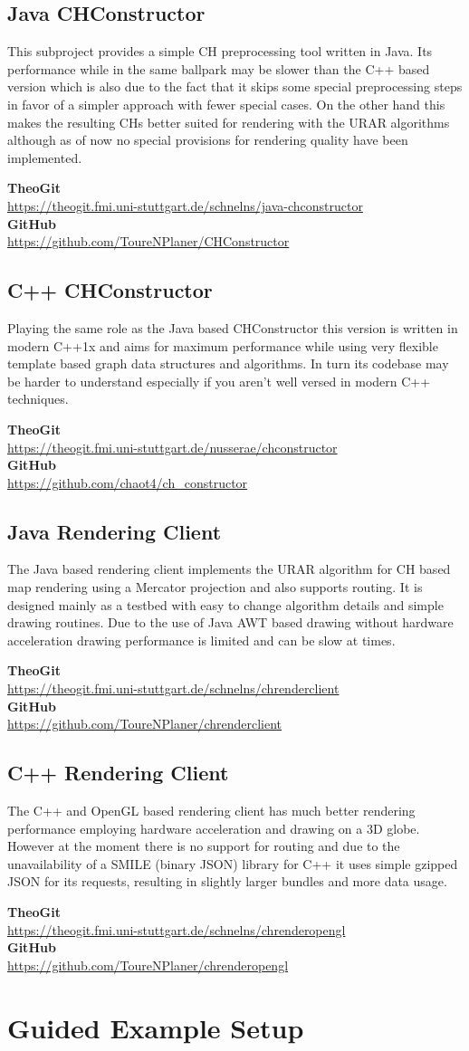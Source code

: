 \documentclass[titlepage,parskip=true]{scrartcl}
\newcommand{\repobox}[2]{
	\begin{shaded}
		\textbf{TheoGit}\\\hspace{5mm}\url{#1}\\
		\textbf{GitHub}\\\hspace{5mm}\url{#2}
	\end{shaded}
}
\begin{document}
\subsection{Java CHConstructor}
This subproject provides a simple CH preprocessing tool written in Java. Its
performance while in the same ballpark may be slower than the C++ based version
which is also due to the fact that it skips some special preprocessing steps in
favor of a simpler approach with fewer special cases. On the other hand this
makes the resulting CHs better suited for rendering with the URAR algorithms
although as of now no special provisions for rendering quality have been
implemented.
\repobox{https://theogit.fmi.uni-stuttgart.de/schnelns/java-chconstructor}{https://github.com/ToureNPlaner/CHConstructor}
\subsection{C++ CHConstructor}
Playing the same role as the Java based CHConstructor this version is written
in modern C++1x and aims for maximum performance while using very flexible
template based graph data structures and algorithms. In turn its codebase may
be harder to understand especially if you aren't well versed in modern C++
techniques.
\repobox{https://theogit.fmi.uni-stuttgart.de/nusserae/chconstructor}{https://github.com/chaot4/ch\_constructor}
\subsection{Java Rendering Client}
The Java based rendering client implements the URAR algorithm for CH based map
rendering using a Mercator projection and also supports routing. It is designed
mainly as a testbed with easy to change algorithm details and simple drawing
routines. Due to the use of Java AWT based drawing without hardware
acceleration drawing performance is limited and can be slow at times.
\repobox{https://theogit.fmi.uni-stuttgart.de/schnelns/chrenderclient}{https://github.com/ToureNPlaner/chrenderclient}
\subsection{C++ Rendering Client}
The C++ and OpenGL based rendering client has much better rendering performance
employing hardware acceleration and drawing on a 3D globe. However at the
moment there is no support for routing and due to the unavailability of a SMILE
(binary JSON) library for C++ it uses simple gzipped JSON for its requests,
resulting in slightly larger bundles and more data usage.
\repobox{https://theogit.fmi.uni-stuttgart.de/schnelns/chrenderopengl}{https://github.com/ToureNPlaner/chrenderopengl}
\section{Guided Example Setup}
\label{sec:setup}
\end{document}
